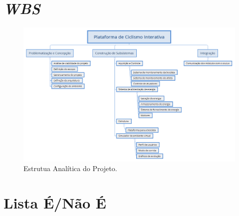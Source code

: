 \section{\textit{WBS}}

 \begin{figure}[!ht]
	\centering
		\includegraphics[scale=0.4]{figuras/eap}
	\caption{Estrutua Analítica do Projeto.}
\end{figure} 

\section{Lista É/Não É}

